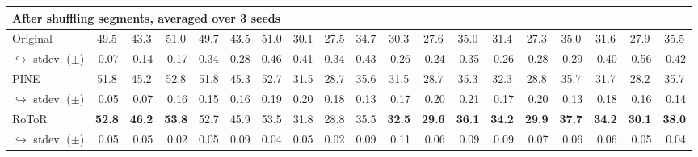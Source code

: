\begin{table*}[t]
{\begin{tabular}{@{}lcccccccccccccccccc@{}}
\multicolumn{19}{l}{\textbf{After shuffling segments, averaged over 3 seeds}} \\ \midrule
\multicolumn{1}{l|}{Original} & 49.5 & 43.3 & \multicolumn{1}{c|}{51.0} & 49.7 & 43.5 & \multicolumn{1}{c|}{51.0} & 30.1 & 27.5 & \multicolumn{1}{c|}{34.7} & 30.3 & 27.6 & \multicolumn{1}{c|}{35.0} & 31.4 & 27.3 & \multicolumn{1}{c|}{35.0} & 31.6 & 27.9 & 35.5 \\
\multicolumn{1}{r|}{$\hookrightarrow$ stdev. ($\pm$)} & \multicolumn{1}{r}{\small 0.07} & \multicolumn{1}{r}{\small 0.14} & \multicolumn{1}{r|}{\small 0.17} & \multicolumn{1}{r}{\small 0.34} & \multicolumn{1}{r}{\small 0.28} & \multicolumn{1}{r|}{\small 0.46} & \multicolumn{1}{r}{\small 0.41} & \multicolumn{1}{r}{\small 0.34} & \multicolumn{1}{r|}{\small 0.43} & \multicolumn{1}{r}{\small 0.26} & \multicolumn{1}{r}{\small 0.24} & \multicolumn{1}{r|}{\small 0.35} & \multicolumn{1}{r}{\small 0.26} & \multicolumn{1}{r}{\small 0.28} & \multicolumn{1}{r|}{\small 0.29} & \multicolumn{1}{r}{\small 0.40} & \multicolumn{1}{r}{\small 0.56} & \multicolumn{1}{r}{\small 0.42} \\
\multicolumn{1}{l|}{PINE} & 51.8 & 45.2 & \multicolumn{1}{c|}{52.8} & 51.8 & 45.3 & \multicolumn{1}{c|}{52.7} & 31.5 & 28.7 & \multicolumn{1}{c|}{35.6} & 31.5 & 28.7 & \multicolumn{1}{c|}{35.3} & 32.3 & 28.8 & \multicolumn{1}{c|}{35.7} & 31.7 & 28.2 & 35.7 \\
\multicolumn{1}{r|}{$\hookrightarrow$ stdev. ($\pm$)} & \multicolumn{1}{r}{\small 0.05} & \multicolumn{1}{r}{\small 0.07} & \multicolumn{1}{r|}{\small 0.16} & \multicolumn{1}{r}{\small 0.15} & \multicolumn{1}{r}{\small 0.16} & \multicolumn{1}{r|}{\small 0.19} & \multicolumn{1}{r}{\small 0.20} & \multicolumn{1}{r}{\small 0.18} & \multicolumn{1}{r|}{\small 0.13} & \multicolumn{1}{r}{\small 0.17} & \multicolumn{1}{r}{\small 0.20} & \multicolumn{1}{r|}{\small 0.21} & \multicolumn{1}{r}{\small 0.17} & \multicolumn{1}{r}{\small 0.20} & \multicolumn{1}{r|}{\small 0.13} & \multicolumn{1}{r}{\small 0.18} & \multicolumn{1}{r}{\small 0.16} & \multicolumn{1}{r}{\small 0.14} \\
\multicolumn{1}{l|}{RoToR} & \textbf{52.8} & \textbf{46.2} & \multicolumn{1}{c|}{\textbf{53.8}} & 52.7 & 45.9 & \multicolumn{1}{c|}{53.5} & 31.8 & 28.8 & \multicolumn{1}{c|}{35.5} & \textbf{32.5} & \textbf{29.6} & \multicolumn{1}{c|}{\textbf{36.1}} & \textbf{34.2} & \textbf{29.9} & \multicolumn{1}{c|}{\textbf{37.7}} & \textbf{34.2} & \textbf{30.1} & \textbf{38.0} \\
\multicolumn{1}{r|}{$\hookrightarrow$ stdev. ($\pm$)} & \multicolumn{1}{r}{\small 0.05} & \multicolumn{1}{r}{\small 0.05} & \multicolumn{1}{r|}{\small 0.02} & \multicolumn{1}{r}{\small 0.05} & \multicolumn{1}{r}{\small 0.09} & \multicolumn{1}{r|}{\small 0.04} & \multicolumn{1}{r}{\small 0.05} & \multicolumn{1}{r}{\small 0.02} & \multicolumn{1}{r|}{\small 0.09} & \multicolumn{1}{r}{\small 0.11} & \multicolumn{1}{r}{\small 0.06} & \multicolumn{1}{r|}{\small 0.09} & \multicolumn{1}{r}{\small 0.09} & \multicolumn{1}{r}{\small 0.07} & \multicolumn{1}{r|}{\small 0.06} & \multicolumn{1}{r}{\small 0.06} & \multicolumn{1}{r}{\small 0.05} & \multicolumn{1}{r}{\small 0.04} \\

\end{tabular}}
\end{table*}
